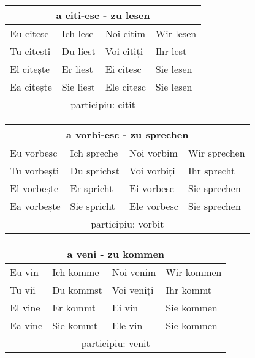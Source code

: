 \documentclass[11pt, oneside]{article}
\begin{document}
%
\begin{center}
  \begin{tabular}{ |p{3.25cm}|p{3.25cm}||p{3.25cm}|p{3.25cm}| }
      \hline
      \multicolumn{4}{|c|}{a citi-esc - zu lesen} \\
      \hline
      \hline
      Eu citesc & Ich lese & Noi citim & Wir lesen\\
      \hline
      Tu citești & Du liest & Voi citiți & Ihr lest\\
      \hline
      El citește & Er liest & Ei citesc & Sie lesen\\ 
      Ea citește & Sie liest & Ele citesc & Sie lesen\\
      \hline
      \multicolumn{4}{|c|}{participiu: citit} \\
      \hline
     \end{tabular}
\end{center}
%
\begin{center}
  \begin{tabular}{ |p{3.25cm}|p{3.25cm}||p{3.25cm}|p{3.25cm}| }
      \hline
      \multicolumn{4}{|c|}{a vorbi-esc - zu sprechen} \\
      \hline
      \hline
      Eu vorbesc & Ich spreche & Noi vorbim & Wir sprechen\\
      \hline
      Tu vorbești & Du sprichst & Voi vorbiți & Ihr sprecht\\
      \hline
      El vorbește & Er spricht & Ei vorbesc & Sie sprechen\\ 
      Ea vorbește & Sie spricht & Ele vorbesc & Sie sprechen\\
      \hline
      \multicolumn{4}{|c|}{participiu: vorbit} \\
      \hline
     \end{tabular}
\end{center}
%
\begin{center}
  \begin{tabular}{ |p{3.25cm}|p{3.25cm}||p{3.25cm}|p{3.25cm}| }
      \hline
      \multicolumn{4}{|c|}{a veni - zu kommen} \\
      \hline
      \hline
      Eu vin & Ich komme & Noi venim & Wir kommen\\
      \hline
      Tu vii & Du kommst & Voi veniți & Ihr kommt\\
      \hline
      El vine & Er kommt & Ei vin & Sie kommen\\ 
      Ea vine & Sie kommt & Ele vin & Sie kommen\\
      \hline
      \multicolumn{4}{|c|}{participiu: venit} \\
      \hline
     \end{tabular}
\end{center}
\end{document}
